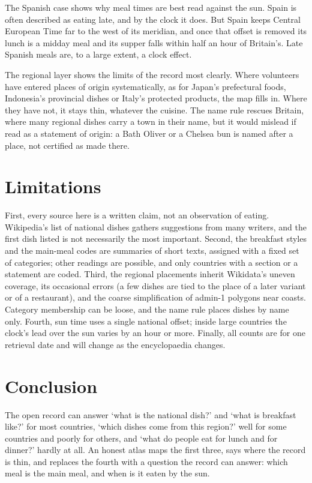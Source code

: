 \documentclass[11pt,a4paper]{article}
\begin{document}
The Spanish case shows why meal times are best read against the sun. Spain is often described as eating late, and by the clock it does. But Spain keeps Central European Time far to the west of its meridian, and once that offset is removed its lunch is a midday meal and its supper falls within half an hour of Britain's. Late Spanish meals are, to a large extent, a clock effect.

The regional layer shows the limits of the record most clearly. Where volunteers have entered places of origin systematically, as for Japan's prefectural foods, Indonesia's provincial dishes or Italy's protected products, the map fills in. Where they have not, it stays thin, whatever the cuisine. The name rule rescues Britain, where many regional dishes carry a town in their name, but it would mislead if read as a statement of origin: a Bath Oliver or a Chelsea bun is named after a place, not certified as made there.

\section{Limitations}
First, every source here is a written claim, not an observation of eating. Wikipedia's list of national dishes gathers suggestions from many writers, and the first dish listed is not necessarily the most important. Second, the breakfast styles and the main-meal codes are summaries of short texts, assigned with a fixed set of categories; other readings are possible, and only countries with a section or a statement are coded. Third, the regional placements inherit Wikidata's uneven coverage, its occasional errors (a few dishes are tied to the place of a later variant or of a restaurant), and the coarse simplification of admin-1 polygons near coasts. Category membership can be loose, and the name rule places dishes by name only. Fourth, sun time uses a single national offset; inside large countries the clock's lead over the sun varies by an hour or more. Finally, all counts are for one retrieval date and will change as the encyclopaedia changes.

\section{Conclusion}
The open record can answer `what is the national dish?' and `what is breakfast like?' for most countries, `which dishes come from this region?' well for some countries and poorly for others, and `what do people eat for lunch and for dinner?' hardly at all. An honest atlas maps the first three, says where the record is thin, and replaces the fourth with a question the record can answer: which meal is the main meal, and when is it eaten by the sun.
\end{document}
